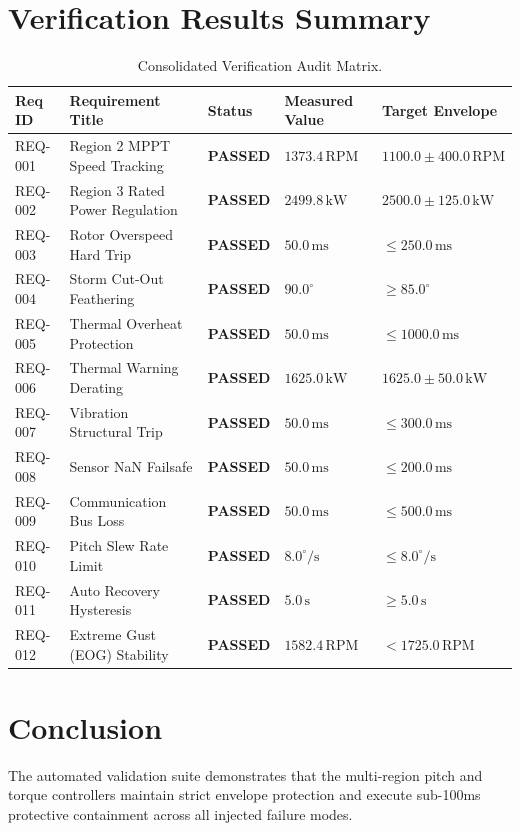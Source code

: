 \documentclass[11pt,a4paper]{article}
\begin{document}
\section{Verification Results Summary}
\begin{table}[h]
\centering
\small
\begin{tabular}{@{}lllll@{}}
\toprule
\textbf{Req ID} & \textbf{Requirement Title} & \textbf{Status} & \textbf{Measured Value} & \textbf{Target Envelope} \\ \midrule
REQ-001 & Region 2 MPPT Speed Tracking & \textbf{PASSED} & $1373.4\,\text{RPM}$ & $1100.0 \pm 400.0\,\text{RPM}$ \\
REQ-002 & Region 3 Rated Power Regulation & \textbf{PASSED} & $2499.8\,\text{kW}$ & $2500.0 \pm 125.0\,\text{kW}$ \\
REQ-003 & Rotor Overspeed Hard Trip & \textbf{PASSED} & $50.0\,\text{ms}$ & $\le 250.0\,\text{ms}$ \\
REQ-004 & Storm Cut-Out Feathering & \textbf{PASSED} & $90.0^\circ$ & $\ge 85.0^\circ$ \\
REQ-005 & Thermal Overheat Protection & \textbf{PASSED} & $50.0\,\text{ms}$ & $\le 1000.0\,\text{ms}$ \\
REQ-006 & Thermal Warning Derating & \textbf{PASSED} & $1625.0\,\text{kW}$ & $1625.0 \pm 50.0\,\text{kW}$ \\
REQ-007 & Vibration Structural Trip & \textbf{PASSED} & $50.0\,\text{ms}$ & $\le 300.0\,\text{ms}$ \\
REQ-008 & Sensor NaN Failsafe & \textbf{PASSED} & $50.0\,\text{ms}$ & $\le 200.0\,\text{ms}$ \\
REQ-009 & Communication Bus Loss & \textbf{PASSED} & $50.0\,\text{ms}$ & $\le 500.0\,\text{ms}$ \\
REQ-010 & Pitch Slew Rate Limit & \textbf{PASSED} & $8.0^\circ/\text{s}$ & $\le 8.0^\circ/\text{s}$ \\
REQ-011 & Auto Recovery Hysteresis & \textbf{PASSED} & $5.0\,\text{s}$ & $\ge 5.0\,\text{s}$ \\
REQ-012 & Extreme Gust (EOG) Stability & \textbf{PASSED} & $1582.4\,\text{RPM}$ & $< 1725.0\,\text{RPM}$ \\ \bottomrule
\end{tabular}
\caption{Consolidated Verification Audit Matrix.}
\end{table}

\section{Conclusion}
The automated validation suite demonstrates that the multi-region pitch and torque controllers maintain strict envelope protection and execute sub-100ms protective containment across all injected failure modes.
\end{document}
